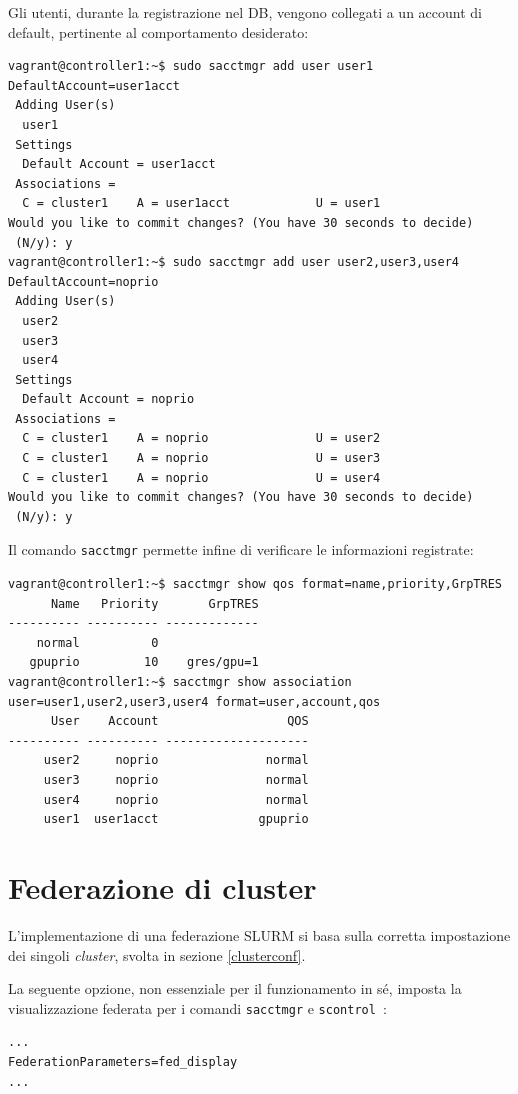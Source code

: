 \documentclass[12pt,a4paper,twoside,openright]{book}
\begin{document}
Gli utenti, durante la registrazione nel \ac{DB}, vengono collegati a un account di default, pertinente al comportamento desiderato:
\begin{verbatim}
vagrant@controller1:~$ sudo sacctmgr add user user1 DefaultAccount=user1acct
 Adding User(s)
  user1
 Settings
  Default Account = user1acct
 Associations =
  C = cluster1    A = user1acct            U = user1
Would you like to commit changes? (You have 30 seconds to decide)
 (N/y): y
vagrant@controller1:~$ sudo sacctmgr add user user2,user3,user4 DefaultAccount=noprio
 Adding User(s)
  user2
  user3
  user4
 Settings
  Default Account = noprio
 Associations =
  C = cluster1    A = noprio               U = user2
  C = cluster1    A = noprio               U = user3
  C = cluster1    A = noprio               U = user4
Would you like to commit changes? (You have 30 seconds to decide)
 (N/y): y
\end{verbatim}
Il comando \texttt{sacctmgr} permette infine di verificare le informazioni registrate:
\begin{verbatim}
vagrant@controller1:~$ sacctmgr show qos format=name,priority,GrpTRES
      Name   Priority       GrpTRES
---------- ---------- -------------
    normal          0              
   gpuprio         10    gres/gpu=1
vagrant@controller1:~$ sacctmgr show association user=user1,user2,user3,user4 format=user,account,qos
      User    Account                  QOS
---------- ---------- --------------------
     user2     noprio               normal
     user3     noprio               normal
     user4     noprio               normal
     user1  user1acct              gpuprio
\end{verbatim}

\section{Federazione di cluster}
L'implementazione di una federazione \ac{SLURM} si basa sulla corretta impostazione dei singoli \textit{cluster}, svolta in sezione \ref{clusterconf}.

La seguente opzione, non essenziale per il funzionamento in sé, imposta la visualizzazione federata per i comandi \texttt{sacctmgr} e \texttt{scontrol}~\cite{slurmfederation}:
\begin{verbatim}
...
FederationParameters=fed_display
...
\end{verbatim}
\end{document}
